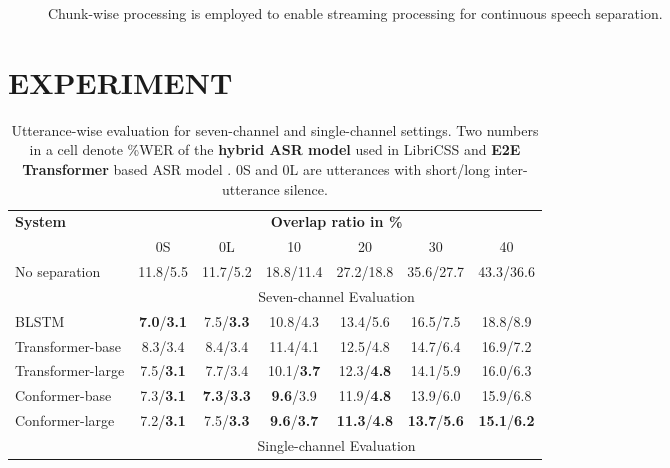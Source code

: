 \documentclass{article}
\begin{document}
	\begin{figure}[t]
		\centering
		\caption{Chunk-wise processing is employed to enable streaming processing for continuous speech separation.
		}\label{fig:sliding_window}
		\vspace{-4.5mm}
	\end{figure}
	
	
	\section{EXPERIMENT}
	
	\begin{table*}[!t]
		\centering
		\caption{ Utterance-wise evaluation for seven-channel and single-channel settings. Two numbers in a cell denote \%WER of the \textbf{hybrid ASR model} used in LibriCSS \cite{chen2020continuous} and \textbf{E2E Transformer} based ASR model \cite{wang2019semantic}. 0S and 0L are utterances with short/long inter-utterance silence.}
		\label{tab:7ch_utt_result}
		
		\begin{tabular}{l|cccccc} 
			\toprule \hline
			\multirow{2}{*}{\textbf{System}} &
			\multicolumn{6}{c}{\textbf{Overlap ratio in \%}} \\ &
			0S & 0L & 10 & 20 & 30 & 40   \\ \hline
			No separation \cite{chen2020continuous} & 11.8/5.5 & 11.7/5.2 & 18.8/11.4 & 27.2/18.8 & 35.6/27.7 & 43.3/36.6 \\\hline
			&   \multicolumn{6}{c}{Seven-channel Evaluation} \\ 
			\hline
BLSTM & \textbf{7.0}/\textbf{3.1} & 7.5/\textbf{3.3} & 10.8/4.3 & 13.4/5.6 & 16.5/7.5 & 18.8/8.9 \\ 
Transformer-base & 8.3/3.4 & 8.4/3.4 & 11.4/4.1 & 12.5/4.8 & 14.7/6.4 & 16.9/7.2 \\					
			Transformer-large & 7.5/\textbf{3.1} &	7.7/3.4 &	10.1/\textbf{3.7} &	12.3/\textbf{4.8} &	14.1/5.9 &	16.0/6.3 \\
			
			Conformer-base & 7.3/\textbf{3.1} & \textbf{7.3}/\textbf{3.3} & \textbf{9.6}/3.9 & 11.9/\textbf{4.8} &	13.9/6.0 &	15.9/6.8 \\
			Conformer-large & 7.2/\textbf{3.1} & 7.5/\textbf{3.3} & \textbf{9.6}/\textbf{3.7} & \textbf{11.3}/\textbf{4.8} & \textbf{13.7}/\textbf{5.6} & \textbf{15.1}/\textbf{6.2} \\ \hline
			&   \multicolumn{6}{c}{Single-channel Evaluation}  \\ \hline
			

\end{tabular}
\end{table*}
\end{document}

